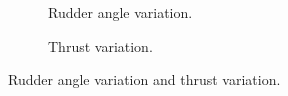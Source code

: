 \begin{figure}[h]
     \centering
     \begin{subfigure}[b]{0.49\textwidth}
         \centering
         
        \caption{Rudder angle variation.}
        \label{fig:circle_drift_Y_H}
     \end{subfigure}
     \hfill
     \begin{subfigure}[b]{0.49\textwidth}
         \centering
         
        \caption{Thrust variation.}
        \label{fig:circle_drift_N_H}
     \end{subfigure}
    \caption{Rudder angle variation and thrust variation.}
    \label{fig:circle_drift}
\end{figure}